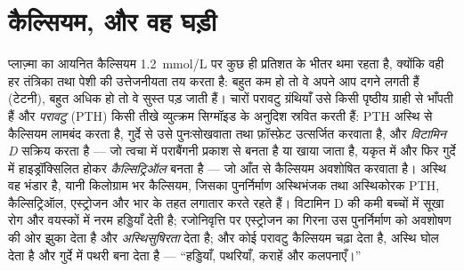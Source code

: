\section{कैल्सियम, और वह घड़ी}

\begin{definition}[कैल्सियम का समस्थापन]\label{def:b3:endocrinology:calcium}
प्लाज़्मा का आयनित कैल्सियम \qty{1.2}{mmol/L} पर कुछ ही प्रतिशत के
भीतर थमा रहता है, क्योंकि वही हर तंत्रिका तथा पेशी की उत्तेजनीयता तय
करता है: बहुत कम हो तो वे अपने आप दगने लगती हैं (टेटनी), बहुत अधिक हो
तो वे सुस्त पड़ जाती हैं। चारों परावटु ग्रंथियाँ उसे किसी पृष्ठीय
ग्राही से भाँपती हैं और \emph{परावटु } (PTH) किसी तीखे व्युत्क्रम
सिग्मॉइड के अनुदिश स्रवित करती हैं: PTH अस्थि से कैल्सियम लामबंद करता
है, गुर्दे से उसे पुनःसोखवाता तथा फ़ॉस्फ़ेट उत्सर्जित करवाता है, और
\emph{विटामिन D} सक्रिय करता है --- जो त्वचा में पराबैंगनी प्रकाश से
बनता है या खाया जाता है, यकृत में और फिर गुर्दे में हाइड्रॉक्सिलित होकर
\emph{कैल्सिट्रिऑल} बनता है --- जो आँत से कैल्सियम अवशोषित करवाता है।
अस्थि वह भंडार है, यानी किलोग्राम भर कैल्सियम, जिसका पुनर्निर्माण
अस्थिभंजक तथा अस्थिकोरक PTH, कैल्सिट्रिऑल, एस्ट्रोजन और भार के तहत
लगातार करते रहते हैं। विटामिन D की कमी बच्चों में सूखा रोग और वयस्कों
में नरम हड्डियाँ देती है; रजोनिवृत्ति पर एस्ट्रोजन का गिरना उस
पुनर्निर्माण को अवशोषण की ओर झुका देता है और \emph{अस्थिसुषिरता} देता
है; और कोई परावटु  कैल्सियम चढ़ा देता है, अस्थि घोल देता है और
गुर्दे में पथरी बना देता है --- ``हड्डियाँ, पथरियाँ, कराहें और
कलपनाएँ।''
\end{definition}

